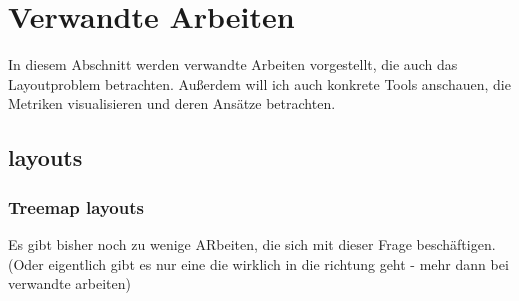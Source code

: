 \section{Verwandte Arbeiten} \label{sec:VerwandteArbeiten}
In diesem Abschnitt werden verwandte Arbeiten vorgestellt, die auch das Layoutproblem betrachten.
Außerdem will ich auch konkrete Tools anschauen, die Metriken visualisieren und deren Ansätze betrachten.

\subsection{layouts}

\subsubsection{Treemap layouts}
Es gibt bisher noch zu wenige ARbeiten, die sich mit dieser Frage beschäftigen. (Oder eigentlich gibt es nur eine die wirklich in die richtung geht - mehr dann bei verwandte arbeiten)